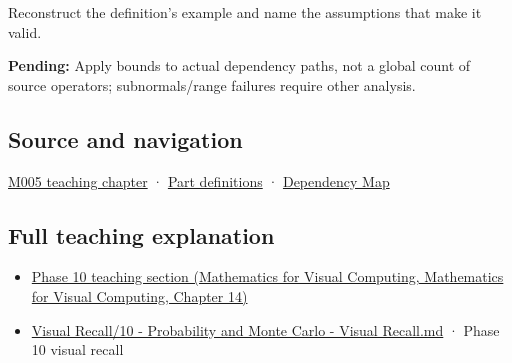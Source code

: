 Reconstruct the definition's example and name the assumptions that make it valid.

\textbf{Pending:} Apply bounds to actual dependency paths, not a global count of source operators; subnormals/range failures require other analysis.

\subsection{Source and navigation}\label{appendix-f82e270791c8-source-and-navigation}

\hyperref[01-foundations-i-ch001-when-arithmetic-meets-uncertainty]{M005 teaching chapter} · \hyperref[appendix-fd090d982a15-m005---parts-77-88]{Part definitions} · \hyperref[appendix-4ad47bdd269a]{Dependency Map}

\subsection{Full teaching explanation}\label{appendix-f82e270791c8-full-teaching-explanation}

\begin{itemize}
\tightlist
\item
  \href{../02-Mathematics-for-Visual-Computing/main.pdf\#nameddest=02-foundations-ii-ch030-finite-samples-need-stable-descriptive-statistics}{Phase 10 teaching section (Mathematics for Visual Computing, Mathematics for Visual Computing, Chapter 14)}
\item
  \hyperref[appendix-cb5af353ef77]{Visual Recall/10 - Probability and Monte Carlo - Visual Recall.md} · Phase 10 visual recall
\end{itemize}

